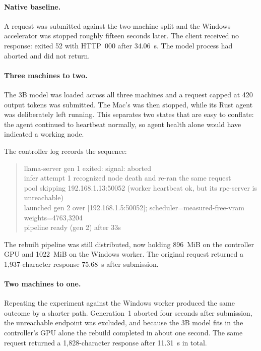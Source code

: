 \paragraph{Native baseline.}
A request was submitted against the two-machine split and the Windows
accelerator was stopped roughly fifteen seconds later. The client received no
response:  exited 52 with HTTP~000 after \SI{34.06}{\second}. The
model process had aborted and did not return.

\paragraph{Three machines to two.}
The 3B model was loaded across all three machines and a request capped at 420
output tokens was submitted. The Mac's  was then stopped,
while its Rust agent was deliberately left running. This separates two states
that are easy to conflate: the agent continued to heartbeat normally, so agent
health alone would have indicated a working node.

The controller log records the sequence:

\begin{quote}\small\ttfamily
llama-server gen 1 exited: signal: aborted\\
infer attempt 1 recognized node death and re-ran the same request\\
pool skipping 192.168.1.13:50052 (worker heartbeat ok, but its rpc-server is unreachable)\\
launched gen 2 over [192.168.1.5:50052]; scheduler=measured-free-vram weights=4763,3204\\
pipeline ready (gen 2) after 33s
\end{quote}

The rebuilt pipeline was still distributed, now holding \SI{896}{MiB} on the
controller GPU and \SI{1022}{MiB} on the Windows worker. The original request
returned a 1{,}937-character response \SI{75.68}{\second} after submission.

\paragraph{Two machines to one.}
Repeating the experiment against the Windows worker produced the same outcome by
a shorter path. Generation~1 aborted four seconds after submission, the
unreachable endpoint was excluded, and because the 3B model fits in the
controller's GPU alone the rebuild completed in about one second. The same
request returned a 1{,}828-character response after \SI{11.31}{\second} in
total.

